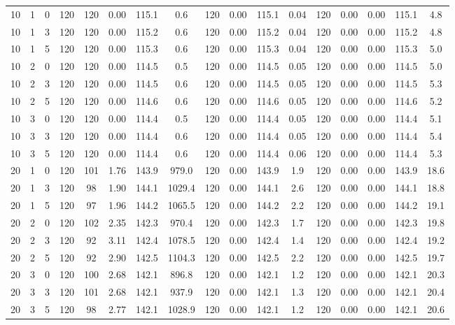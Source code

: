 \documentclass[3p, authoryear, 11pt]{elsarticle}
\begin{document}
\begin{table}[H]
\begin{tabular}{cccc cccc cccc ccccc}
    10 & 1 & 0 & 120 & 120 & 0.00 & 115.1 & 0.6 & 120 & 0.00 & 115.1 & 0.04 & 120 & 0.00 & 0.00 & 115.1 & 4.8 \\
    10 & 1 & 3 & 120 & 120 & 0.00 & 115.2 & 0.6 & 120 & 0.00 & 115.2 & 0.04 & 120 & 0.00 & 0.00 & 115.2 & 4.8 \\
    10 & 1 & 5 & 120 & 120 & 0.00 & 115.3 & 0.6 & 120 & 0.00 & 115.3 & 0.04 & 120 & 0.00 & 0.00 & 115.3 & 5.0 \\
    \cmidrule{1-17}
    10 & 2 & 0 & 120 & 120 & 0.00 & 114.5 & 0.5 & 120 & 0.00 & 114.5 & 0.05 & 120 & 0.00 & 0.00 & 114.5 & 5.0 \\
    10 & 2 & 3 & 120 & 120 & 0.00 & 114.5 & 0.6 & 120 & 0.00 & 114.5 & 0.05 & 120 & 0.00 & 0.00 & 114.5 & 5.3 \\
    10 & 2 & 5 & 120 & 120 & 0.00 & 114.6 & 0.6 & 120 & 0.00 & 114.6 & 0.05 & 120 & 0.00 & 0.00 & 114.6 & 5.2 \\
    \cmidrule{1-17}
    10 & 3 & 0 & 120 & 120 & 0.00 & 114.4 & 0.5 & 120 & 0.00 & 114.4 & 0.05 & 120 & 0.00 & 0.00 & 114.4 & 5.1 \\
    10 & 3 & 3 & 120 & 120 & 0.00 & 114.4 & 0.6 & 120 & 0.00 & 114.4 & 0.05 & 120 & 0.00 & 0.00 & 114.4 & 5.4 \\
    10 & 3 & 5 & 120 & 120 & 0.00 & 114.4 & 0.6 & 120 & 0.00 & 114.4 & 0.06 & 120 & 0.00 & 0.00 & 114.4 & 5.3 \\
    \midrule
    20 & 1 & 0 & 120 & 101 & 1.76 & 143.9 & 979.0 & 120 & 0.00 & 143.9 & 1.9 & 120 & 0.00 & 0.00 & 143.9 & 18.6 \\
    20 & 1 & 3 & 120 & 98 & 1.90 & 144.1 & 1029.4 & 120 & 0.00 & 144.1 & 2.6 & 120 & 0.00 & 0.00 & 144.1 & 18.8 \\
    20 & 1 & 5 & 120 & 97 & 1.96 & 144.2 & 1065.5 & 120 & 0.00 & 144.2 & 2.2 & 120 & 0.00 & 0.00 & 144.2 & 19.1 \\
    \cmidrule{1-17}
    20 & 2 & 0 & 120 & 102 & 2.35 & 142.3 & 970.4 & 120 & 0.00 & 142.3 & 1.7 & 120 & 0.00 & 0.00 & 142.3 & 19.8 \\
    20 & 2 & 3 & 120 & 92 & 3.11 & 142.4 & 1078.5 & 120 & 0.00 & 142.4 & 1.4 & 120 & 0.00 & 0.00 & 142.4 & 19.2 \\
    20 & 2 & 5 & 120 & 92 & 2.90 & 142.5 & 1104.3 & 120 & 0.00 & 142.5 & 2.2 & 120 & 0.00 & 0.00 & 142.5 & 19.7 \\
    \cmidrule{1-17}
    20 & 3 & 0 & 120 & 100 & 2.68 & 142.1 & 896.8 & 120 & 0.00 & 142.1 & 1.2 & 120 & 0.00 & 0.00 & 142.1 & 20.3 \\
    20 & 3 & 3 & 120 & 101 & 2.68 & 142.1 & 937.9 & 120 & 0.00 & 142.1 & 1.3 & 120 & 0.00 & 0.00 & 142.1 & 20.4 \\
    20 & 3 & 5 & 120 & 98 & 2.77 & 142.1 & 1028.9 & 120 & 0.00 & 142.1 & 1.2 & 120 & 0.00 & 0.00 & 142.1 & 20.6 \\
    \midrule



\end{tabular}
\end{table}
\end{document}
